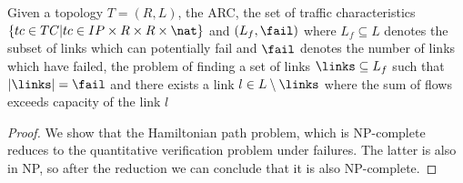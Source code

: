 \begin{theorem}
Given a topology $T = (R, L)$, the ARC, the set of  
traffic characteristics $\{tc \in TC | tc \in IP \times R \times R \times \nat\}$ and 
$(L_f, \fail)$ where $L_f \subseteq L$ denotes the subset of links 
which can potentially fail and $\fail$ denotes the number of links which have failed,
the problem of finding a set of links $\links \subseteq L_f$ such that $|\links| = \fail$
and there exists a link $l \in L \setminus \links$ where the sum of flows exceeds capacity of the link $l$
\end{theorem}

\begin{proof}
We show that the Hamiltonian path problem, which is NP-complete reduces to the
quantitative verification problem under failures. The latter is also in NP, so after the reduction we 
 can conclude that it is also NP-complete.
 
\end{proof} 
